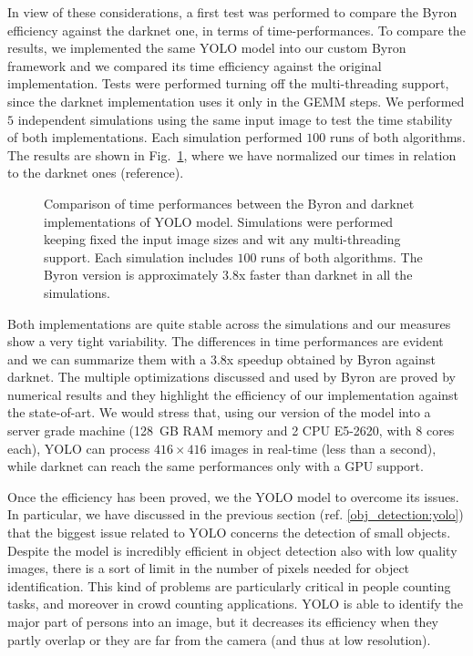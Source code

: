 \documentclass{standalone}
\begin{document}
In view of these considerations, a first test was performed to compare the \textsf{Byron} efficiency against the \textsf{darknet} one, in terms of time-performances.
To compare the results, we implemented the same YOLO model into our custom \textsf{Byron} framework and we compared its time efficiency against the original implementation.
Tests were performed turning off the multi-threading support, since the \textsf{darknet} implementation uses it only in the \textsf{GEMM} steps.
We performed $5$ independent simulations using the same input image to test the time stability of both implementations.
Each simulation performed $100$ runs of both algorithms.
The results are shown in Fig.~\ref{fig:yolo_time}, where we have normalized our times in relation to the \textsf{darknet} ones (reference).

\begin{figure}[htbp]
\centering
\def\svgwidth{0.85\textwidth}

\caption{Comparison of time performances between the \textsf{Byron} and \textsf{darknet} implementations of YOLO model.
Simulations were performed keeping fixed the input image sizes and wit any multi-threading support.
Each simulation includes $100$ runs of both algorithms.
The \textsf{Byron} version is approximately $3.8$x faster than \textsf{darknet} in all the simulations.
}
\label{fig:yolo_time}
\end{figure}

Both implementations are quite stable across the simulations and our measures show a very tight variability.
The differences in time performances are evident and we can summarize them with a $3.8$x speedup obtained by \textsf{Byron} against \textsf{darknet}.
The multiple optimizations discussed and used by \textsf{Byron} are proved by numerical results and they highlight the efficiency of our implementation against the state-of-art.
We would stress that, using our version of the model into a server grade machine (128~GB RAM memory and 2 CPU E5-2620, with 8 cores each), YOLO can process $416\times416$ images in real-time (less than a second), while \textsf{darknet} can reach the same performances only with a GPU support.

Once the efficiency has been proved, we  the YOLO model to overcome its issues.
In particular, we have discussed in the previous section (ref. \ref{obj_detection:yolo}) that the biggest issue related to YOLO concerns the detection of small objects.
Despite the model is incredibly efficient in object detection also with low quality images, there is a sort of limit in the number of pixels needed for object identification.
This kind of problems are particularly critical in people counting tasks, and moreover in crowd counting applications.
YOLO is able to identify the major part of persons into an image, but it decreases its efficiency when they partly overlap or they are far from the camera (and thus at low resolution).
\end{document}
